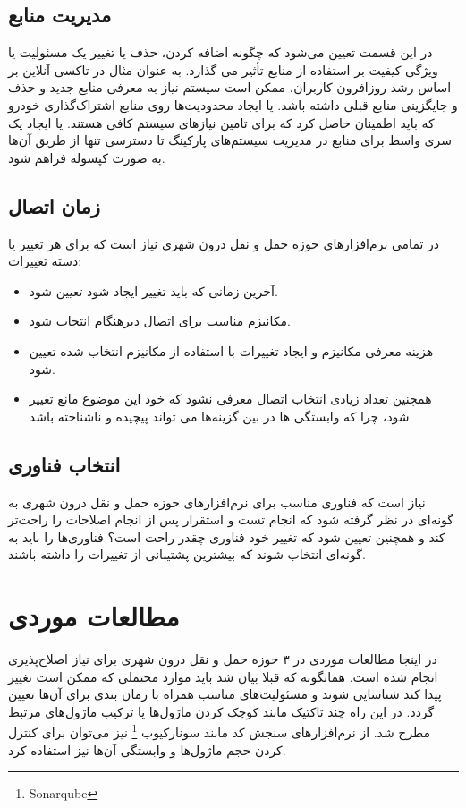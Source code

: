 \subsection{مدیریت منابع}
در این قسمت تعیین می‌شود که چگونه اضافه کردن، حذف یا تغییر یک مسئولیت یا ویژگی کیفیت بر استفاده از منابع تأثیر می گذارد. به عنوان مثال در تاکسی آنلاین بر اساس رشد روزافرون کاربران، ممکن است سیستم نیاز به معرفی منابع جدید و حذف و جایگزینی منابع قبلی داشته باشد. یا ایجاد محدودیت‌ها روی منابع اشتراک‌گذاری خودرو که باید اطمینان حاصل کرد که برای تامین نیازهای سیستم کافی هستند. یا ایجاد یک سری واسط برای منابع در مدیریت سیستم‌های پارکینگ تا دسترسی تنها از طریق آن‌ها به صورت کپسوله فراهم شود.
\subsection{زمان اتصال}
در تمامی نرم‌افزارهای حوزه حمل و نقل درون شهری نیاز است که برای هر تغییر یا دسته تغییرات:
\begin{itemize}
\item
آخرین زمانی که باید تغییر ایجاد شود تعیین شود.
\item
مکانیزم مناسب برای اتصال دیرهنگام انتخاب شود.
\item
هزینه معرفی مکانیزم و ایجاد تغییرات با استفاده از مکانیزم انتخاب شده تعیین شود.
\item
همچنین تعداد زیادی انتخاب اتصال معرفی نشود که خود این موضوع مانع تغییر شود، چرا که وابستگی ها در بین گزینه‌ها می تواند پیچیده و ناشناخته باشد.
\end{itemize}
\subsection{انتخاب فناوری}
نیاز است که فناوری مناسب برای نرم‌افزارهای حوزه حمل و نقل درون شهری به گونه‌ای در نظر گرفته شود که انجام تست و استقرار پس از انجام اصلاحات را راحت‌تر کند و همچنین تعیین شود که تغییر خود فناوری چقدر راحت است؟ فناوری‌ها را باید به گونه‌ای انتخاب شوند که بیشترین پشتیبانی از تغییرات را داشته باشند.

\section{مطالعات موردی}

در اینجا مطالعات موردی در ۳ حوزه حمل و نقل درون شهری برای نیاز اصلاح‌‌پذیری انجام شده است.
همانگونه که قبلا بیان شد باید موارد محتملی که ممکن است تغییر پیدا کند شناسایی شوند و مسئولیت‌های مناسب همراه با زمان بندی برای آن‌ها تعیین گردد. در این راه چند تاکتیک مانند کوچک کردن ماژول‌ها یا ترکیب ماژول‌های مرتبط مطرح شد.
از نرم‌افزارهای سنجش کد مانند سونارکیوب
\footnote{Sonarqube}
نیز می‌توان برای کنترل کردن حجم ماژول‌ها و وابستگی آن‌ها نیز استفاده کرد. 
